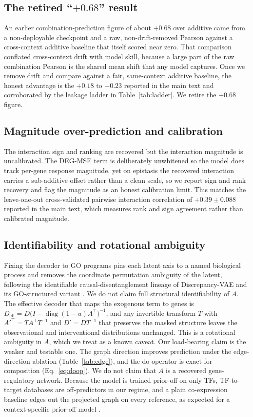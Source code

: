 \subsection{The retired ``$+0.68$'' result}
An earlier combination-prediction figure of about $+0.68$ over additive came from a
non-deployable checkpoint and a raw, non-drift-removed Pearson against a cross-context
additive baseline that itself scored near zero. That comparison conflated cross-context
drift with model skill, because a large part of the raw combination Pearson is the shared
mean shift that any model captures. Once we remove drift and compare against a fair,
same-context additive baseline, the honest advantage is the $+0.18$ to $+0.23$ reported in
the main text and corroborated by the leakage ladder in Table~\ref{tab:ladder}. We retire
the $+0.68$ figure.

\subsection{Magnitude over-prediction and calibration}
The interaction sign and ranking are recovered but the interaction magnitude is
uncalibrated. The DEG-MSE term is deliberately unwhitened so the model does track per-gene
response magnitude, yet on epistasis the recovered interaction carries a sub-additive
offset rather than a clean scale, so we report sign and rank recovery and flag the magnitude
as an honest calibration limit. This matches the leave-one-out cross-validated pairwise
interaction correlation of $+0.39\pm0.088$ reported in the main text, which measures rank
and sign agreement rather than calibrated magnitude.

\subsection{Identifiability and rotational ambiguity}
Fixing the decoder to GO programs pins each latent axis to a named biological process and
removes the coordinate permutation ambiguity of the latent, following the identifiable
causal-disentanglement lineage of Discrepancy-VAE and its GO-structured variant
\citep{zhang2023discrepancyvae,sena2025}. We do not claim full structural identifiability of
$A$. The effective decoder that maps the exogenous term to genes is
$D_{\mathrm{eff}}=D\big(I-\operatorname{diag}(1-u)A^{\top}\big)^{-1}$, and any invertible
transform $T$ with $A'^{\top}=T A^{\top}T^{-1}$ and $D'=DT^{-1}$ that preserves the masked
structure leaves the observational and interventional distributions unchanged. This is a
rotational ambiguity in $A$, which we treat as a known caveat. Our load-bearing claim is the
weaker and testable one. The graph direction improves prediction under the edge-direction
ablation (Table~\ref{tab:edge}), and the do-operator is exact for composition
(Eq.~\ref{eq:doop}). We do not claim that $A$ is a recovered gene-regulatory network. Because
the model is trained prior-off on only TFs, TF-to-target databases are off-predictors in our
regime, and a plain co-expression baseline edges out the projected graph on every reference,
as expected for a context-specific prior-off model \citep{genernib2025,collectri2023,garcia2019dorothea,szklarczyk2023string}.

